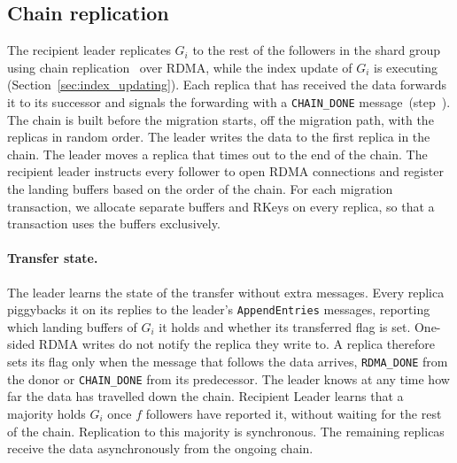 \fi

\subsection{Chain replication}
\label{sec:chain-replication}

The recipient leader replicates $G_i$ to the rest of the followers in the shard group using chain replication~\cite{chain-replication} over RDMA, while the index update of $G_i$ is executing (Section~\ref{sec:index_updating}).
Each replica that has received the data forwards it to its successor and signals the forwarding with a \texttt{CHAIN\_DONE} message~(step~).
The chain is built before the migration starts, off the migration path, with the replicas in random order.
The leader writes the data to the first replica in the chain.
The leader moves a replica that times out to the end of the chain.
The recipient leader instructs every follower to open RDMA connections and register the landing buffers based on the order of the chain.
For each migration transaction, we allocate separate buffers and RKeys on every replica, so that a transaction uses the buffers exclusively.

\paragraph{Transfer state.}
The leader learns the state of the transfer without extra messages.
Every replica piggybacks it on its replies to the leader's \texttt{AppendEntries} messages, reporting which landing buffers of $G_i$ it holds and whether its transferred flag is set.
One-sided RDMA writes do not notify the replica they write to.
A replica therefore sets its flag only when the message that follows the data arrives, \texttt{RDMA\_DONE} from the donor or \texttt{CHAIN\_DONE} from its predecessor.
The leader knows at any time how far the data has travelled down the chain.
Recipient Leader learns that a majority holds $G_i$ once $f$ followers have reported it, without waiting for the rest of the chain.
Replication to this majority is synchronous. The remaining replicas receive the data asynchronously from the ongoing chain.

